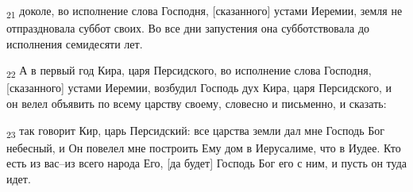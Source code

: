 \begin{tcolorbox}
\textsubscript{21} доколе, во исполнение слова Господня, [сказанного] устами Иеремии, земля не отпраздновала суббот своих. Во все дни запустения она субботствовала до исполнения семидесяти лет.
\end{tcolorbox}
\begin{tcolorbox}
\textsubscript{22} А в первый год Кира, царя Персидского, во исполнение слова Господня, [сказанного] устами Иеремии, возбудил Господь дух Кира, царя Персидского, и он велел объявить по всему царству своему, словесно и письменно, и сказать:
\end{tcolorbox}
\begin{tcolorbox}
\textsubscript{23} так говорит Кир, царь Персидский: все царства земли дал мне Господь Бог небесный, и Он повелел мне построить Ему дом в Иерусалиме, что в Иудее. Кто есть из вас--из всего народа Его, [да будет] Господь Бог его с ним, и пусть он туда идет.
\end{tcolorbox}
